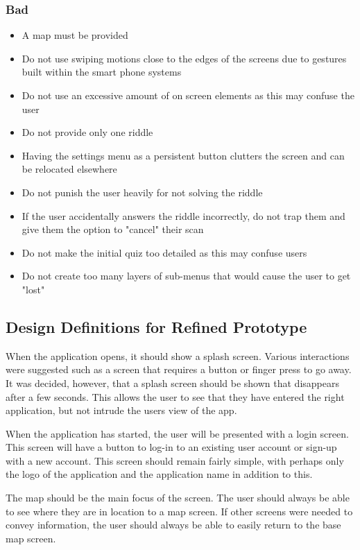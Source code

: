 \documentclass[10pt,twocolumn]{article} %
\begin{document}
\subsubsection*{Bad}
\begin{itemize}[noitemsep]
  \item A map must be provided
  \item Do not use swiping motions close to the edges of the screens due to gestures built within the smart phone systems
  \item Do not use an excessive amount of on screen elements as this may confuse the user
  \item Do not provide only one riddle
  \item Having the settings menu as a persistent button clutters the screen and can be relocated elsewhere
  \item Do not punish the user heavily for not solving the riddle
  \item If the user accidentally answers the riddle incorrectly, do not trap them and give them the option to "cancel" their scan
  \item Do not make the initial quiz too detailed as this may confuse users
  \item Do not create too many layers of sub-menus that would cause the user to get "lost"
\end{itemize}



\subsection*{Design Definitions for Refined Prototype} 

When the application opens, it should show a splash screen. Various interactions were suggested such as a screen that requires a button or finger press to go away. It was decided, however, that a splash screen should be shown that disappears after a few seconds. This allows the user to see that they have entered the right application, but not intrude the users view of the app.

When the application has started, the user will be presented with a login screen. This screen will have a button to log-in to an existing user account or sign-up with a new account. This screen should remain fairly simple, with perhaps only the logo of the application and the application name in addition to this.

The map should be the main focus of the screen. The user should always be able to see where they are in location to a map screen. If other screens were needed to convey information, the user should always be able to easily return to the base map screen.
\end{document}
